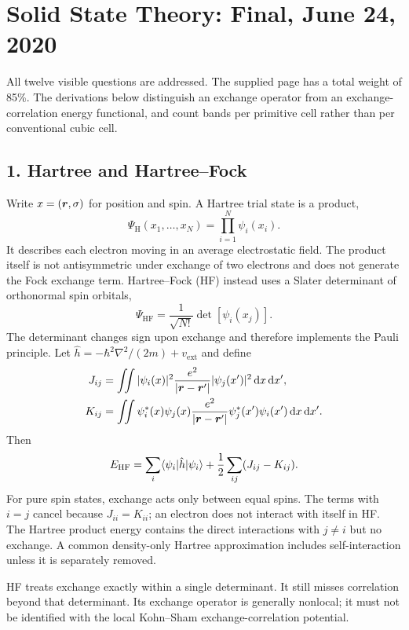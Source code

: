 \chapter{Solid State Theory: Final, June 24, 2020}
\label{s:theory-2020-06-final}
\begin{sourceNote}
All twelve visible questions are addressed. The supplied page has a total weight of 85\%. The derivations below distinguish an exchange operator from an exchange-correlation energy functional, and count bands per primitive cell rather than per conventional cubic cell.
\end{sourceNote}

\section*{1. Hartree and Hartree--Fock}
Write $x=(\boldsymbol{r},\sigma)$ for position and spin. A Hartree trial state is a product,
\[
\Psi_{\mathrm H}(x_1,\ldots,x_N)=\prod_{i=1}^N\psi_i(x_i).
\]
It describes each electron moving in an average electrostatic field. The product itself is not antisymmetric under exchange of two electrons and does not generate the Fock exchange term. Hartree--Fock (HF) instead uses a Slater determinant of orthonormal spin orbitals,
\[
\Psi_{\mathrm{HF}}=\frac{1}{\sqrt{N!}}\det[\psi_i(x_j)].
\]
The determinant changes sign upon exchange and therefore implements the Pauli principle. Let $\hat h=-\hbar^2\nabla^2/(2m)+v_{\mathrm{ext}}$ and define
\begin{align*}
J_{ij}&=\iint |\psi_i(x)|^2\frac{e^2}{|\boldsymbol{r}-\boldsymbol{r}'|}|\psi_j(x')|^2\mathop{}\!\mathrm{d} x\mathop{}\!\mathrm{d} x',\\
K_{ij}&=\iint\psi_i^*(x)\psi_j(x)\frac{e^2}{|\boldsymbol{r}-\boldsymbol{r}'|}\psi_j^*(x')\psi_i(x')\mathop{}\!\mathrm{d} x\mathop{}\!\mathrm{d} x'.
\end{align*}
Then
\[
E_{\mathrm{HF}}=\sum_i\langle\psi_i\rvert\hat h\lvert\psi_i\rangle
 +\frac12\sum_{ij}(J_{ij}-K_{ij}).
\]
For pure spin states, exchange acts only between equal spins. The terms with $i=j$ cancel because $J_{ii}=K_{ii}$; an electron does not interact with itself in HF. The Hartree product energy contains the direct interactions with $j\ne i$ but no exchange. A common density-only Hartree approximation includes self-interaction unless it is separately removed.

HF treats exchange exactly within a single determinant. It still misses correlation beyond that determinant. Its exchange operator is generally nonlocal; it must not be identified with the local Kohn--Sham exchange-correlation potential.

